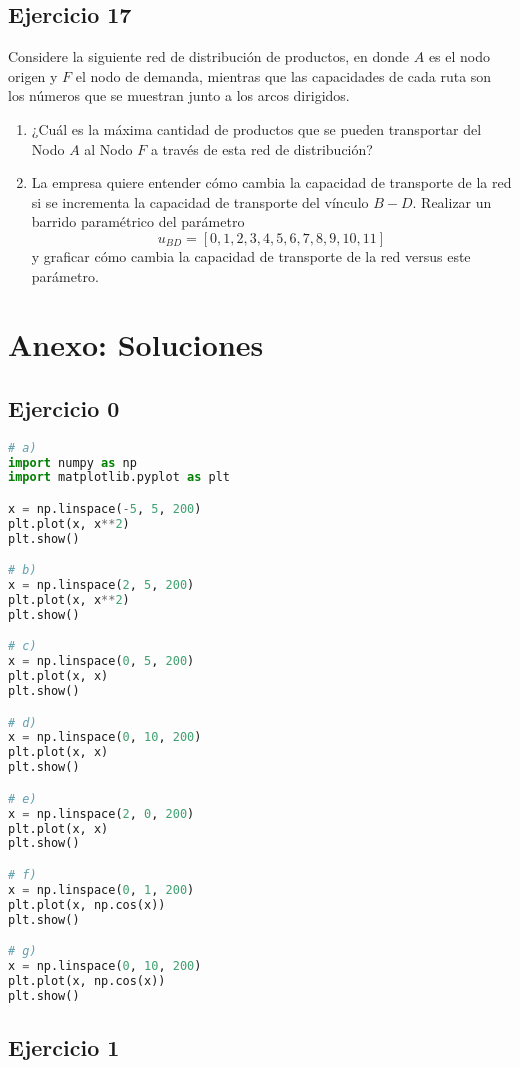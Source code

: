 \documentclass[12pt]{article}
\begin{document}
\subsection{Ejercicio 17}

Considere la siguiente red de distribución de productos, en donde \(A\) es el nodo origen y \(F\) el nodo de demanda, mientras que las capacidades de cada ruta son los números que se muestran junto a los arcos dirigidos.

\begin{enumerate}
\item ¿Cuál es la máxima cantidad de productos que se pueden transportar del Nodo \(A\) al Nodo \(F\) a través de esta red de distribución?
\item La empresa quiere entender cómo cambia la capacidad de transporte de la red si se incrementa la capacidad de transporte del vínculo \(B-D\). Realizar un barrido paramétrico del parámetro 
\[
u_{BD} = [0,1,2,3,4,5,6,7,8,9,10,11]
\]
y graficar cómo cambia la capacidad de transporte de la red versus este parámetro.
\end{enumerate}

\newpage

\section{Anexo: Soluciones}

\subsection{Ejercicio 0}
\begin{lstlisting}[language=Python]
# a)
import numpy as np
import matplotlib.pyplot as plt

x = np.linspace(-5, 5, 200)
plt.plot(x, x**2)
plt.show()

# b)
x = np.linspace(2, 5, 200)
plt.plot(x, x**2)
plt.show()

# c)
x = np.linspace(0, 5, 200)
plt.plot(x, x)
plt.show()

# d)
x = np.linspace(0, 10, 200)
plt.plot(x, x)
plt.show()

# e)
x = np.linspace(2, 0, 200)
plt.plot(x, x)
plt.show()

# f)
x = np.linspace(0, 1, 200)
plt.plot(x, np.cos(x))
plt.show()

# g)
x = np.linspace(0, 10, 200)
plt.plot(x, np.cos(x))
plt.show()
\end{lstlisting}

\subsection{Ejercicio 1}
\end{document}
